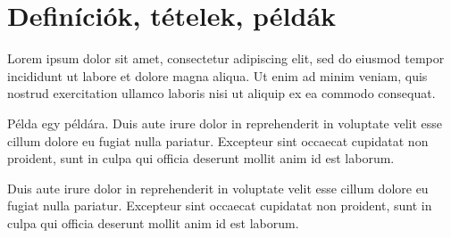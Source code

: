 \section{Definíciók, tételek, példák}

\begin{definition}
Lorem ipsum dolor sit amet, consectetur adipiscing elit, sed do eiusmod tempor incididunt ut labore et dolore magna aliqua. Ut enim ad minim veniam, quis nostrud exercitation ullamco laboris nisi ut aliquip ex ea commodo consequat. 
\end{definition}

\begin{example}
Példa egy példára. Duis aute irure dolor in reprehenderit in voluptate velit esse cillum dolore eu fugiat nulla pariatur. Excepteur sint occaecat cupidatat non proident, sunt in culpa qui officia deserunt mollit anim id est laborum.
\end{example}

\begin{theorem}
Duis aute irure dolor in reprehenderit in voluptate velit esse cillum dolore eu fugiat nulla pariatur. Excepteur sint occaecat cupidatat non proident, sunt in culpa qui officia deserunt mollit anim id est laborum.
\end{theorem}


